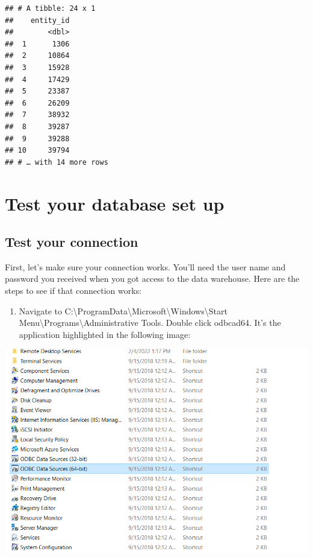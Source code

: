 \documentclass[]{book}
\providecommand{\tightlist}{%
  \setlength{\itemsep}{0pt}\setlength{\parskip}{0pt}}
\begin{document}
\begin{verbatim}
## # A tibble: 24 x 1
##    entity_id
##        <dbl>
##  1      1306
##  2     10864
##  3     15928
##  4     17429
##  5     23387
##  6     26209
##  7     38932
##  8     39287
##  9     39288
## 10     39794
## # … with 14 more rows
\end{verbatim}

\hypertarget{appendix-appendix}{%
\appendix}


\hypertarget{test-cdw}{%
\chapter{Test your database set up}\label{test-cdw}}

\hypertarget{test-your-connection}{%
\section{Test your connection}\label{test-your-connection}}

First, let's make sure your connection works. You'll need the user name and password you received when you got access to the data warehouse. Here are the steps to see if that connection works:

\begin{enumerate}
\def\labelenumi{\arabic{enumi})}
\tightlist
\item
  Navigate to C:\textbackslash ProgramData\textbackslash Microsoft\textbackslash Windows\textbackslash Start Menu\textbackslash Programs\textbackslash Administrative Tools. Double click odbcad64. It's the application highlighted in the following image:
\end{enumerate}

\includegraphics[width=15.67in]{images/syswow64}
\end{document}
